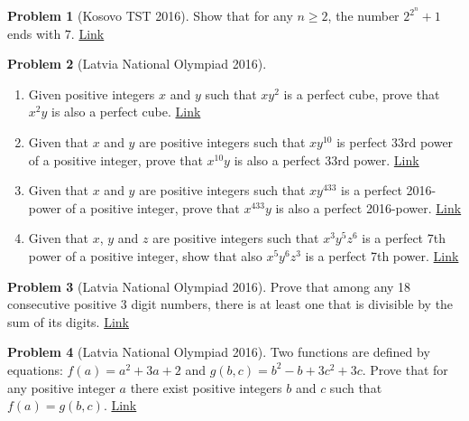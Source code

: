 \documentclass[]{article}
\theoremstyle{definition}
\newtheorem{problem}{Problem}
\begin{document}
\begin{problem}[Kosovo TST 2016]
	Show that for any $n\geq 2$, the number $2^{2^n}+1$ ends with $7$. \hfill \href{http://artofproblemsolving.com/community/c6h1222334p6119900}{Link}
\end{problem}




\begin{problem}[Latvia National Olympiad 2016]
	$ $
	\begin{enumerate}
		\item Given positive integers $x$ and $y$ such that $xy^2$ is a perfect cube, prove that $x^2y$ is also a perfect cube. \hfill \href{http://artofproblemsolving.com/community/c6h1276625p6698532}{Link}
		\item Given that $x$ and $y$ are positive integers such that $xy^{10}$ is perfect 33rd power of a positive integer, prove that $x^{10}y$ is also a perfect 33rd power. \hfill \href{http://artofproblemsolving.com/community/c6h1276645p6698675}{Link}
		\item Given that $x$ and $y$ are positive integers such that $xy^{433}$ is a perfect 2016-power of a positive integer, prove that $x^{433}y$ is also a perfect 2016-power. \hfill \href{http://artofproblemsolving.com/community/c6h1276664p6698829}{Link}
		\item Given that $x$, $y$ and $z$ are positive integers such that $x^3y^5z^6$ is a perfect 7th power of a positive integer, show that also $x^5y^6z^3$ is a perfect 7th power. \hfill \href{http://artofproblemsolving.com/community/c6h1276676p6699066}{Link}
	\end{enumerate}
\end{problem}





\begin{problem}[Latvia National Olympiad 2016]
	Prove that among any 18 consecutive positive $3$ digit numbers, there is at least one that is divisible by the sum of its digits. \hfill \href{http://artofproblemsolving.com/community/c6h1276687p6699218}{Link}
\end{problem}




\begin{problem}[Latvia National Olympiad 2016]
	Two functions are defined by equations: $f(a) = a^2 + 3a + 2$ and $g(b, c) = b^2 - b + 3c^2 + 3c$. Prove that for any positive integer $a$ there exist positive integers $b$ and $c$ such that $f(a) = g(b, c)$. \flushright \href{http://artofproblemsolving.com/community/c6h1276691p6699257}{Link}
\end{problem}
\end{document}

